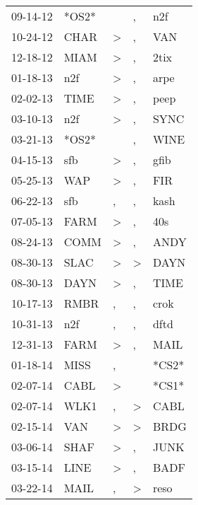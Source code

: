 \begin{supertabular}{lllll}
 09-14-12 &  *OS2* &                  &                , &    n2f \\
 10-24-12 &   CHAR &     \textgreater &                , &    VAN \\
 12-18-12 &   MIAM &     \textgreater &                , &   2tix \\
 01-18-13 &    n2f &     \textgreater &                , &   arpe \\
 02-02-13 &   TIME &     \textgreater &                , &   peep \\
 03-10-13 &    n2f &     \textgreater &                , &   SYNC \\
 03-21-13 &  *OS2* &                  &                , &   WINE \\
 04-15-13 &    sfb &     \textgreater &                , &   gfib \\
 05-25-13 &    WAP &     \textgreater &                , &    FIR \\
 06-22-13 &    sfb &                , &                , &   kash \\
 07-05-13 &   FARM &     \textgreater &                , &    40s \\
 08-24-13 &   COMM &     \textgreater &                , &   ANDY \\
 08-30-13 &   SLAC &     \textgreater &     \textgreater &   DAYN \\
 08-30-13 &   DAYN &     \textgreater &                , &   TIME \\
 10-17-13 &   RMBR &                , &                , &   crok \\
 10-31-13 &    n2f &                , &                , &   dftd \\
 12-31-13 &   FARM &     \textgreater &                , &   MAIL \\
 01-18-14 &   MISS &                , &                  &  *CS2* \\
 02-07-14 &   CABL &     \textgreater &                  &  *CS1* \\
 02-07-14 &   WLK1 &                , &     \textgreater &   CABL \\
 02-15-14 &    VAN &     \textgreater &     \textgreater &   BRDG \\
 03-06-14 &   SHAF &     \textgreater &                , &   JUNK \\
 03-15-14 &   LINE &     \textgreater &                , &   BADF \\
 03-22-14 &   MAIL &                , &     \textgreater &   reso \\

\end{supertabular}
